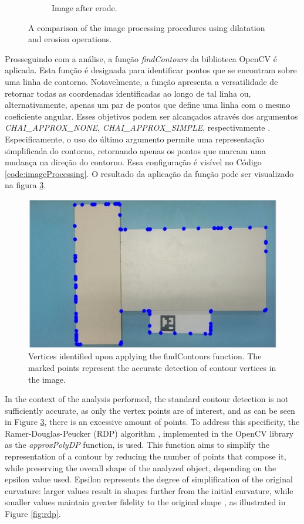 \begin{figure}[!ht]
\begin{subfigure}[b]{0.325\linewidth}
         \caption{Image after erode.}
         \label{fig:imageProcessingExampleB}
     \end{subfigure}
      \caption{A comparison of the image processing procedures using dilatation and erosion  operations.}
      \label{fig:erode}
\end{figure}


Prosseguindo com a análise, a função \emph{findContours} da biblioteca OpenCV é aplicada. Esta função é designada para identificar pontos que se encontram sobre uma linha de contorno. Notavelmente, a função apresenta a versatilidade de retornar todas as coordenadas identificadas ao longo de tal linha ou, alternativamente, apenas um par de pontos que define uma linha com o mesmo coeficiente angular. Esses objetivos podem ser alcançados através dos argumentos \emph{CHAI\_APPROX\_NONE}, \emph{CHAI\_APPROX\_SIMPLE}, respectivamente \cite{open_source_computer_vision_opencv_2023}. Especificamente, o uso do último argumento permite uma representação simplificada do contorno, retornando apenas os pontos que marcam uma mudança na direção do contorno. Essa configuração é visível no Código \ref{code:imageProcessing}. O resultado da aplicação da função pode ser visualizado na figura \ref{fig:findCountours}.

\begin{figure}[!ht]
 \centering
         \centering
         \includegraphics[width=0.65\linewidth]{images/Development/chap4/fullcorners.jpg}
         \caption{Vertices identified upon applying the findContours function. The marked points represent the accurate detection of contour vertices in the image.}
         \label{fig:findCountours}
\end{figure}

In the context of the analysis performed, the standard contour detection is not sufficiently accurate, as only the vertex points are of interest, and as can be seen in Figure \ref{fig:findCountours}, there is an excessive amount of points. To address this specificity, the Ramer-Douglas-Peucker (RDP) algorithm \cite{Soendoro6021584}, implemented in the OpenCV library as the \emph{approxPolyDP} function, is used. This function aims to simplify the representation of a contour by reducing the number of points that compose it, while preserving the overall shape of the analyzed object, depending on the epsilon value used. Epsilon represents the degree of simplification of the original curvature: larger values result in shapes further from the initial curvature, while smaller values maintain greater fidelity to the original shape \cite{minichino2015learning}, as illustrated in Figure \ref{fig:rdp}.


